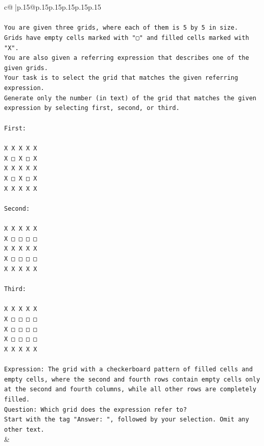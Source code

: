 \documentclass{article}
\begin{document}
{\begin{supertabular}{c@{$\;$}|p{.15\linewidth}@{}p{.15\linewidth}p{.15\linewidth}p{.15\linewidth}p{.15\linewidth}p{.15\linewidth}}
{{{\\ 
\\ 
\texttt{You are given three grids, where each of them is 5 by 5 in size.} \\
\texttt{Grids have empty cells marked with "▢" and filled cells marked with "X".} \\
\texttt{You are also given a referring expression that describes one of the given grids.} \\
\texttt{Your task is to select the grid that matches the given referring expression.} \\
\texttt{Generate only the number (in text) of the grid that matches the given expression by selecting first, second, or third.} \\
\\ 
\texttt{First:} \\
\\ 
\texttt{X X X X X} \\
\texttt{X □ X □ X} \\
\texttt{X X X X X} \\
\texttt{X □ X □ X} \\
\texttt{X X X X X} \\
\\ 
\texttt{Second:} \\
\\ 
\texttt{X X X X X} \\
\texttt{X □ □ □ □} \\
\texttt{X X X X X} \\
\texttt{X □ □ □ □} \\
\texttt{X X X X X} \\
\\ 
\texttt{Third:} \\
\\ 
\texttt{X X X X X} \\
\texttt{X □ □ □ □} \\
\texttt{X □ □ □ □} \\
\texttt{X □ □ □ □} \\
\texttt{X X X X X} \\
\\ 
\texttt{Expression: The grid with a checkerboard pattern of filled cells and empty cells, where the second and fourth rows contain empty cells only at the second and fourth columns, while all other rows are completely filled.} \\
\texttt{Question: Which grid does the expression refer to?} \\
\texttt{Start with the tag "Answer: ", followed by your selection. Omit any other text.} \\
            }
        }
    }
    & \\ \\


\end{supertabular}}
\end{document}
